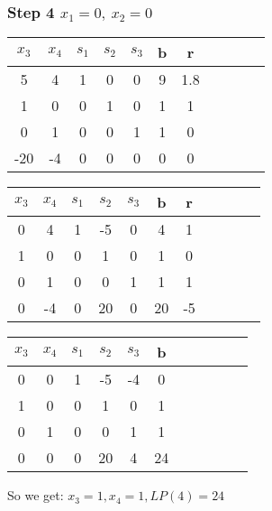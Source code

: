 \documentclass{article}
\begin{document}
\subsubsection*{Step 4 $x_1=0, \: x_2=0$}
\begin{center}
\begin{tabular}{|c|c|c|c|c|c|c|c|c|c|c|}
\hline
$x_3$  & $x_4$ & $s_1$ & $s_2$ & $s_3$ & b  & r \\ \hline
\cellcolor{pink!25}5   & 4  & 1  & 0  & 0  & 9 & 1.8 \\ \hline
\cellcolor{pink!25}1   & \cellcolor{yellow!25}0  & \cellcolor{yellow!25}0  & \cellcolor{yellow!25}1  & \cellcolor{yellow!25}0  & \cellcolor{yellow!25}1 & \cellcolor{yellow!25}1   \\ \hline
\cellcolor{pink!25}0   & 1  & 0  & 0  & 1  & 1 & 0   \\ \hline
\cellcolor{pink!25}-20 & -4 & 0  & 0  & 0  & 0 & 0   \\ \hline
\end{tabular}
\end{center}
\begin{center}
\begin{tabular}{|c|c|c|c|c|c|c|c|c|c|c|}
\hline
$x_3$  & $x_4$ & $s_1$ & $s_2$ & $s_3$ & b  & r \\ \hline
0  & \cellcolor{pink!25}4  & 1  & -5 & 0  & 4  & 1 \\ \hline
1  & \cellcolor{pink!25}0  & 0  & 1  & 0  & 1  & 0 \\ \hline
\cellcolor{yellow!25}0  & \cellcolor{pink!25}1  & \cellcolor{yellow!25}0  & \cellcolor{yellow!25}0  & \cellcolor{yellow!25}1  & \cellcolor{yellow!25}1  & \cellcolor{yellow!25}1 \\ \hline
0  & \cellcolor{pink!25}-4 & 0  & 20 & 0  & 20 &  -5 \\ \hline
\end{tabular}
\end{center}
\begin{center}
\begin{tabular}{|c|c|c|c|c|c|c|c|c|c|c|}
\hline
$x_3$  & $x_4$ & $s_1$ & $s_2$ & $s_3$ & b \\ \hline
0  & 0  & 1  & -5 & -4 & 0  \\ \hline
1  & 0  & 0  & 1  & 0  & 1  \\ \hline
0  & 1  & 0  & 0  & 1  & 1  \\ \hline
0  & 0  & 0  & 20 & 4  & 24 \\ \hline
\end{tabular}
\end{center}
So we get: $x_3=1,x_4=1,LP(4)=24$
\\
\end{document}
